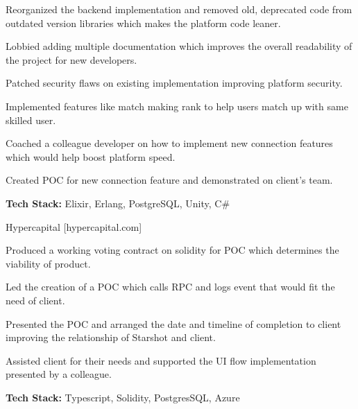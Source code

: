 \begin{cventries}
{\begin{cvitems}
\begin{cvsubitems}
                    \item
                        {Reorganized the backend implementation and removed old, deprecated code from outdated version libraries which makes the platform code leaner.}
                    \item 
                        {Lobbied adding multiple documentation which improves the overall readability of the project for new developers.}
                    \item 
                        {Patched security flaws on existing implementation improving platform security.}
                    \item 
                        {Implemented features like match making rank to help users match up with same skilled user.}
                    \item
                        {Coached a colleague developer on how to implement new connection features which would help boost platform speed.}
                    \item 
                        {Created POC for new connection feature and demonstrated on client's team.}
                    \item 
                        {\textbf{Tech Stack:} Elixir, Erlang, PostgreSQL, Unity, C\#}
                \end{cvsubitems}
                \item
                    {Hypercapital [hypercapital.com]}
                \begin{cvsubitems}
                    \item 
                        {Produced a working voting contract on solidity for POC which determines the viability of product.}
                    \item
                        {Led the creation of a POC which calls RPC and logs event that would fit the need of client.}
                    \item 
                        {Presented the POC and arranged the date and timeline of completion to client improving the relationship of Starshot and client.}
                    \item 
                        {Assisted client for their needs and supported the UI flow implementation presented by a colleague.}
                    \item 
                        {\textbf{Tech Stack:} Typescript, Solidity, PostgresSQL, Azure}                   
                \end{cvsubitems}
            \end{cvitems}
        }
        

\end{cventries}
